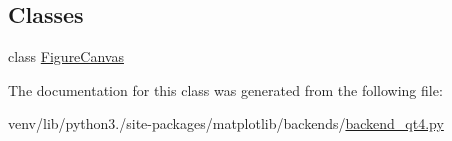 \subsection*{Classes}
\begin{DoxyCompactItemize}
\item 
class \hyperlink{classmatplotlib_1_1backends_1_1backend__qt4_1_1__BackendQT4_1_1FigureCanvas}{Figure\+Canvas}
\end{DoxyCompactItemize}


The documentation for this class was generated from the following file\+:\begin{DoxyCompactItemize}
\item 
venv/lib/python3./site-\/packages/matplotlib/backends/\hyperlink{backend__qt4_8py}{backend\+\_\+qt4.\+py}\end{DoxyCompactItemize}
